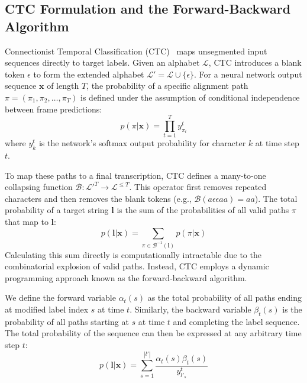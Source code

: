\subsection{CTC Formulation and the Forward-Backward Algorithm}
Connectionist Temporal Classification (CTC)~\cite{graves2006connectionist} maps unsegmented input sequences directly to target labels. Given an alphabet $\mathcal{L}$, CTC introduces a blank token $\epsilon$ to form the extended alphabet $\mathcal{L}' = \mathcal{L} \cup \{\epsilon\}$. For a neural network output sequence $\mathbf{x}$ of length $T$, the probability of a specific alignment path $\pi = (\pi_1, \pi_2, \dots, \pi_T)$ is defined under the assumption of conditional independence between frame predictions:
\begin{equation}
    p(\pi | \mathbf{x}) = \prod_{t=1}^T y_{\pi_t}^t
\end{equation}
where $y_{k}^t$ is the network's softmax output probability for character $k$ at time step $t$.

To map these paths to a final transcription, CTC defines a many-to-one collapsing function $\mathcal{B}: \mathcal{L}'^T \to \mathcal{L}^{\le T}$. This operator first removes repeated characters and then removes the blank tokens (e.g., $\mathcal{B}(a \epsilon \epsilon a a) = a a$). The total probability of a target string $\mathbf{l}$ is the sum of the probabilities of all valid paths $\pi$ that map to $\mathbf{l}$:
\begin{equation}
    p(\mathbf{l} | \mathbf{x}) = \sum_{\pi \in \mathcal{B}^{-1}(\mathbf{l})} p(\pi | \mathbf{x})
\end{equation}
Calculating this sum directly is computationally intractable due to the combinatorial explosion of valid paths. Instead, CTC employs a dynamic programming approach known as the forward-backward algorithm.

We define the forward variable $\alpha_t(s)$ as the total probability of all paths ending at modified label index $s$ at time $t$. Similarly, the backward variable $\beta_t(s)$ is the probability of all paths starting at $s$ at time $t$ and completing the label sequence. The total probability of the sequence can then be expressed at any arbitrary time step $t$:
\begin{equation}
    p(\mathbf{l} | \mathbf{x}) = \sum_{s=1}^{|l'|} \frac{\alpha_t(s) \beta_t(s)}{y_{l'_s}^t}
\end{equation}

